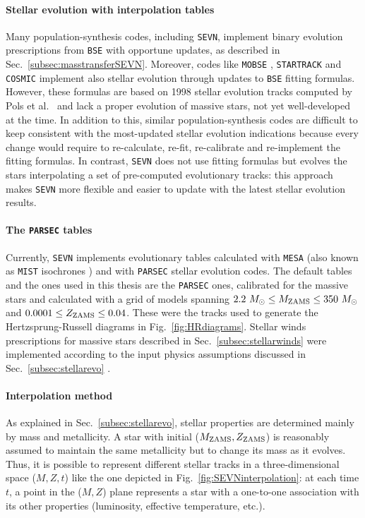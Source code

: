 \documentclass[a4paper,titlepage]{book}     	%
\newcommand{\sun}{\ensuremath{_\odot}}
\newcommand{\mzams}{M_\textup{ZAMS}}
\newcommand{\zzams}{Z_\textup{ZAMS}}
\newcommand{\msun}{\ensuremath{M\sun}}
\begin{document}
\paragraph{Stellar evolution with interpolation tables} Many population-synthesis codes, including \texttt{SEVN}, implement binary evolution prescriptions from \texttt{BSE} with opportune updates, as described in Sec.\ \ref{subsec:masstransferSEVN}. Moreover, codes like \texttt{MOBSE} \cite{giacobbomapelli2018_mobse_fryer}, \texttt{STARTRACK} \cite{Belczynski2010_WRwindsSTARTRACK} and \texttt{COSMIC} \cite{breivik2020cosmicpopsynth} implement also stellar evolution through updates to \texttt{BSE} fitting formulas. However, these formulas are based on 1998 stellar evolution tracks computed by Pols et al.\ \cite{Pols1998evotracks} and lack a proper evolution of massive stars, not yet well-developed at the time. In addition to this, similar population-synthesis codes are difficult to keep consistent with the most-updated stellar evolution indications because every change would require to re-calculate, re-fit, re-calibrate and re-implement the fitting formulas. In contrast, \texttt{SEVN} does not use fitting formulas but evolves the stars interpolating a set of pre-computed evolutionary tracks: this approach makes \texttt{SEVN} more flexible and easier to update with the latest stellar evolution results.

\paragraph{The \texttt{PARSEC} tables} Currently, \texttt{SEVN} implements evolutionary tables calculated with \texttt{MESA} (also known as \texttt{MIST} isochrones \cite{MIST_Choi2016}) and with \texttt{PARSEC} \cite{parsec2015_chen, MassGapStellarEvo_Costa2021} stellar evolution codes. The default tables and the ones used in this thesis are the \texttt{PARSEC} ones, calibrated for the massive stars and calculated with a grid of models spanning $2.2~\msun \leq \mzams \leq 350~\msun$ and $0.0001 \leq \zzams \leq 0.04$. These were the tracks used to generate the Hertzsprung-Russell diagrams in Fig.\ \ref{fig:HRdiagrams}. Stellar winds prescriptions for massive stars described in Sec.\ \ref{subsec:stellarwinds} were implemented according to the input physics assumptions discussed in Sec.\ \ref{subsec:stellarevo} \cite{parsec2015_chen,MassGapStellarEvo_Costa2021}. 

\paragraph{Interpolation method} As explained in Sec.\ \ref{subsec:stellarevo}, stellar properties are determined mainly by mass and metallicity. A star with initial ($\mzams,\zzams$) is reasonably assumed to maintain the same metallicity but to change its mass as it evolves. Thus, it is possible to represent different stellar tracks in a three-dimensional space ($M,Z,t$) like the one depicted in Fig.\ \ref{fig:SEVNinterpolation}: at each time $t$, a point in the ($M,Z$) plane represents a star with a one-to-one association with its other properties (luminosity, effective temperature, etc.).
\end{document}
